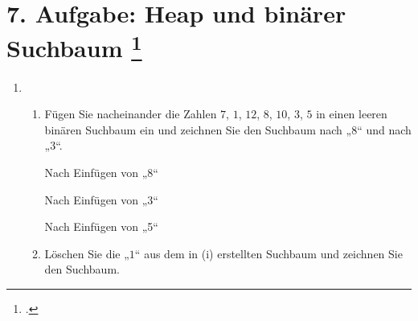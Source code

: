 \documentclass{bschlangaul-aufgabe}
\begin{document}
\section{7. Aufgabe: Heap und binärer Suchbaum
\footcite{examen:66115:2013:09}}

\begin{enumerate}

\item \strut

\begin{enumerate}


\item Fügen Sie nacheinander die Zahlen $7$, $1$, $12$, $8$, $10$, $3$,
$5$ in einen leeren binären Suchbaum ein und zeichnen Sie den Suchbaum
nach „$8$“ und nach „$3$“.

\begin{liDiagramm}{Nach Einfügen von „8“}
\end{liDiagramm}

\begin{liDiagramm}{Nach Einfügen von „3“}
\end{liDiagramm}

\begin{liDiagramm}{Nach Einfügen von „5“}
\end{liDiagramm}


\item Löschen Sie die „$1$“ aus dem in (i) erstellten Suchbaum und
zeichnen Sie den Suchbaum.


\end{enumerate}
\end{enumerate}
\end{document}
